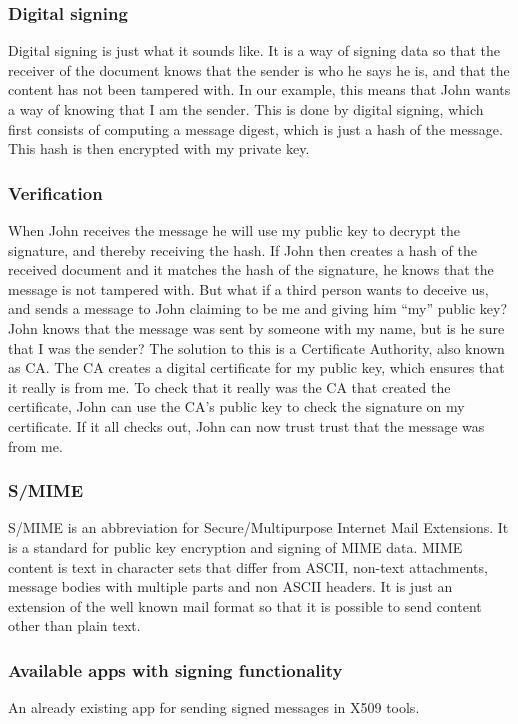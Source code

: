 \subsubsection{Digital signing}
Digital signing is just what it sounds like. It is a way of signing data so that the receiver of the document knows that the sender is who he says he is, and that the content has not been tampered with.\cite{bib:ds} In our example, this means that John wants a way of knowing that I am the sender. This is done by digital signing, which first consists of computing a message digest, which is just a hash of the message. This hash is then encrypted with my private key.


\subsubsection{Verification}
When John receives the message he will use my public key to decrypt the signature, and thereby receiving the hash. If John then creates a hash of the received document and it matches the hash of the signature, he knows that the message is not tampered with. 
\newline
\newline
But what if a third person wants to deceive us, and sends a message to John claiming to be me and giving him “my” public key? John knows that the message was sent by someone with my name, but is he sure that I was the sender? The solution to this is a Certificate Authority, also known as CA. The CA creates a digital certificate for my public key, which ensures that it really is from me. To check that it really was the CA that created the certificate, John can use the CA's public key to check the signature on my certificate. If it all checks out, John can now trust trust that the message was from me.

\subsubsection{S/MIME}
S/MIME is an abbreviation for Secure/Multipurpose Internet Mail Extensions. It is a standard for public key encryption and signing of MIME data\cite{bib:smime}. MIME content is text in character sets that differ from ASCII, non-text attachments, message bodies with multiple parts and non ASCII headers. It is just an extension of the well known mail format so that it is possible to send content other than plain text.

\subsubsection{Available apps with signing functionality}
An already existing app for sending signed messages in X509 tools.

